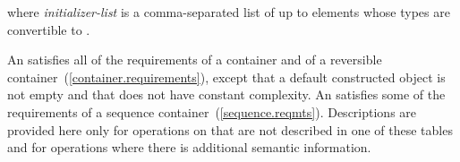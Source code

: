where \textit{initializer-list} is a comma-separated list of up
to  elements whose types are convertible to .

\pnum
{}%
An  satisfies all of the requirements of a container and
of a reversible container~(\ref{container.requirements}), except that a default
constructed  object is not empty and that  does not have constant
complexity. An  satisfies some of the requirements of a sequence
container~(\ref{sequence.reqmts}).
Descriptions are provided here
only for operations on  that are not described in
one of these tables and
for operations where there is additional semantic information.

%
%
%
%
%
%
%
%
%
